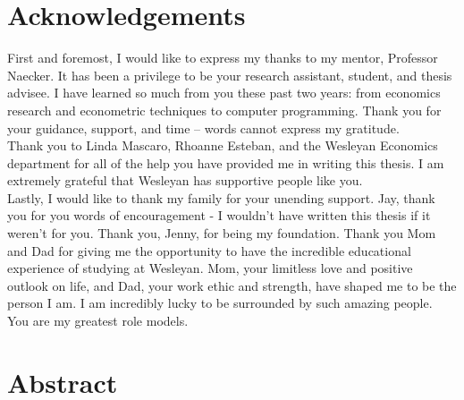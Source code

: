 \documentclass[12pt]{article}
\begin{document}


\newpage
\onehalfspacing
\tableofcontents
\thispagestyle{empty}


\newpage

\clearpage
{} 
\doublespacing
\section*{Acknowledgements}
First and foremost, I would like to express my thanks to my mentor, Professor Naecker. It has been a privilege to be your research assistant, student, and thesis advisee. I have learned so much from you these past two years: from economics research and econometric techniques to computer programming. Thank you for your guidance, support, and time -- words cannot express my gratitude.\\

Thank you to Linda Mascaro, Rhoanne Esteban, and the Wesleyan Economics department for all of the help you have provided me in writing this thesis. I am extremely grateful that Wesleyan has supportive people like you. \\

Lastly, I would like to thank my family for your unending support. Jay, thank you for you words of encouragement - I wouldn\rq t have written this thesis if it weren\rq t for you. Thank you, Jenny, for being my foundation. Thank you Mom and Dad for giving me the opportunity to have the incredible educational experience of studying at Wesleyan. Mom, your limitless love and positive outlook on life, and Dad, your work ethic and strength, have shaped me to be the person I am. I am incredibly lucky to be surrounded by such amazing people. You are my greatest role models.


\newpage

\section*{Abstract}
\end{document}
